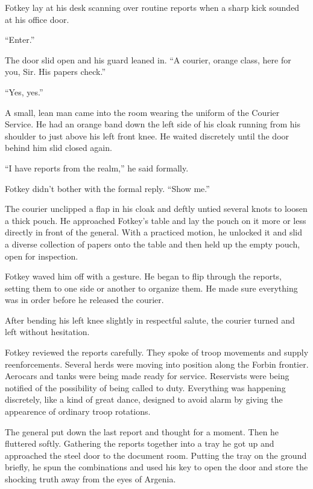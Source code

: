 Fotkey lay at his desk scanning over routine reports when a sharp kick sounded at his office
door.

``Enter.''

The door slid open and his guard leaned in. ``A courier, orange class, here for you, Sir. His
papers check.''

``Yes, yes.''

A small, lean man came into the room wearing the uniform of the Courier Service. He had an
orange band down the left side of his cloak running from his shoulder to just above his left
front knee. He waited discretely until the door behind him slid closed again.

``I have reports from the realm,'' he said formally.

Fotkey didn't bother with the formal reply. ``Show me.''

The courier unclipped a flap in his cloak and deftly untied several knots to loosen a thick
pouch. He approached Fotkey's table and lay the pouch on it more or less directly in front of
the general. With a practiced motion, he unlocked it and slid a diverse collection of papers
onto the table and then held up the empty pouch, open for inspection.


Fotkey waved him off with a gesture. He began to flip through the reports, setting them to one
side or another to organize them. He made sure everything was in order before he released the
courier.

After bending his left knee slightly in respectful salute, the courier turned and left without
hesitation.

Fotkey reviewed the reports carefully. They spoke of troop movements and supply reenforcements.
Several herds were moving into position along the Forbin frontier. Aerocars and tanks were being
made ready for service. Reservists were being notified of the possibility of being called to
duty. Everything was happening discretely, like a kind of great dance, designed to avoid alarm
by giving the appearence of ordinary troop rotations.

The general put down the last report and thought for a moment. Then he fluttered softly.
Gathering the reports together into a tray he got up and approached the steel door to the
document room. Putting the tray on the ground briefly, he spun the combinations and used his key
to open the door and store the shocking truth away from the eyes of Argenia.

